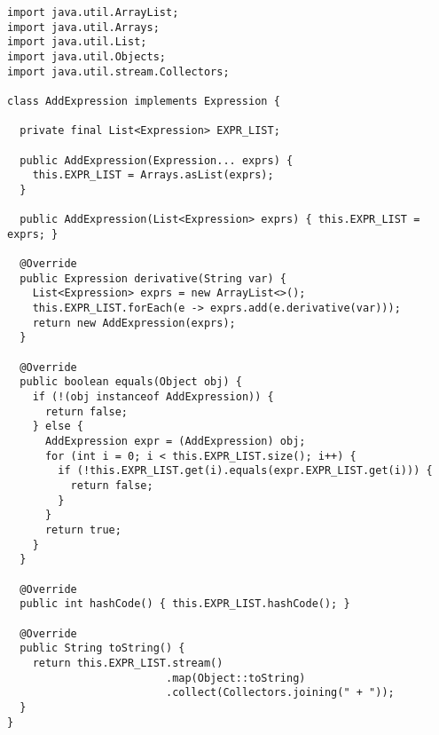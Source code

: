 \begin{cl}[]{}
\begin{lstlisting}[language=MyJava]
import java.util.ArrayList;
import java.util.Arrays;
import java.util.List;
import java.util.Objects;
import java.util.stream.Collectors;

class AddExpression implements Expression {

  private final List<Expression> EXPR_LIST;

  public AddExpression(Expression... exprs) {
    this.EXPR_LIST = Arrays.asList(exprs);
  }

  public AddExpression(List<Expression> exprs) { this.EXPR_LIST = exprs; }

  @Override
  public Expression derivative(String var) {
    List<Expression> exprs = new ArrayList<>();
    this.EXPR_LIST.forEach(e -> exprs.add(e.derivative(var)));
    return new AddExpression(exprs);
  }

  @Override
  public boolean equals(Object obj) {
    if (!(obj instanceof AddExpression)) { 
      return false; 
    } else { 
      AddExpression expr = (AddExpression) obj;
      for (int i = 0; i < this.EXPR_LIST.size(); i++) {
        if (!this.EXPR_LIST.get(i).equals(expr.EXPR_LIST.get(i))) { 
          return false; 
        }
      }
      return true;
    }
  }

  @Override
  public int hashCode() { this.EXPR_LIST.hashCode(); }

  @Override
  public String toString() { 
    return this.EXPR_LIST.stream()
                         .map(Object::toString)
                         .collect(Collectors.joining(" + "));
  }
}
\end{lstlisting}
\end{cl}
